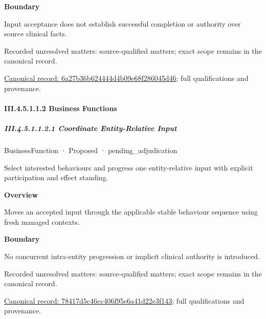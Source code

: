 \textbf{Boundary}



Input acceptance does not establish successful completion or authority over source clinical facts.


{\small Recorded unresolved matters: source-qualified matters; exact scope remains in the canonical record.}\par
{\footnotesize \href{../../../../../../../continuum/business/business-service/6a27b36b624444d4b09e68f286045d46.md}{Canonical record: 6a27b36b624444d4b09e68f286045d46}; full qualifications and provenance.}\par
\paragraph*{III.4.5.1.1.2 Business Functions}
\label{navigation:III.4.5.1.1.2}

\subparagraph*{III.4.5.1.1.2.1 Coordinate Entity-Relative Input}
\label{navigation:III.4.5.1.1.2.1}

\label{element:78417d5c46cc406f95e6a41d22e3f143}
{\small BusinessFunction · Proposed · pending\_adjudication}\par

Select interested behaviours and progress one entity-relative input with explicit participation and effect standing.



\textbf{Overview}



Moves an accepted input through the applicable stable behaviour sequence using fresh managed contexts.



\textbf{Boundary}



No concurrent intra-entity progression or implicit clinical authority is introduced.


{\small Recorded unresolved matters: source-qualified matters; exact scope remains in the canonical record.}\par
{\footnotesize \href{../../../../../../../continuum/business/business-function/78417d5c46cc406f95e6a41d22e3f143.md}{Canonical record: 78417d5c46cc406f95e6a41d22e3f143}; full qualifications and provenance.}\par
